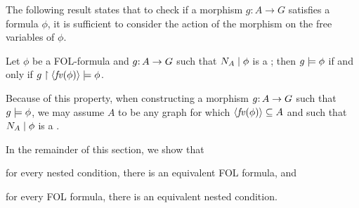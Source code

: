 \begin{comment}
When comparing the satisfaction relations for nested conditions and FOL formulas, a technical issue is that the sets of models for which they are defined are not the same: as seen above, $g\sat\phi$ is defined for $g\of A\to G$ whenever $\fv(\phi)\subseteq N_A$, whereas $g\sat\cT$ for a nested condition $\cT$ is only defined if $A$ is \emph{precisely} $I_\cT$. Due to this discrepancy, there cannot be any $\phi$ and $\cT$ such that $g\sat \phi$ if and only if $g\sat \cT$; instead, the best we can hope for is that this holds whenever $A=\tupof{\fv(\phi)}$. The following property implies that this is indeed all we need to be interested in, since $g$-images for $A$-elements outside $\fv(\phi)$ do not make a difference for satisfaction.

\begin{proposition}\label{prop:free vars only-old}
Let $\phi$ be a FOL-formula and $g\of A\to G$ such that $\fv(\phi)\subseteq N_A$; then $g\sat \phi$ if and only if $g\restr \tupof{\fv(\phi)}\sat \phi$.
\end{proposition}
%
Because of this property, when constructing a morphism $g\of A\to G$ such that $g\sat \phi$, we may assume $A$ to be any graph for which $\tupof{\fv(\phi)}\subseteq A$, without loss of generality.
\end{comment}

The following result states that to check if a morphism $g:A \to G$ satisfies a formula $\phi$, it is sufficient to consider the action of the morphism on the free variables of $\phi$.

\begin{proposition}\label{prop:free vars only}
	Let $\phi$ be a FOL-formula and $g{:}\, A\rightarrow G$ such that ${N_A} \mid {\phi}$ is a {\cfor}; then $g\models \phi$ if and only if $g\restriction \langle \mathit{fv}(\phi)\rangle\models \phi$.
\end{proposition}
%
Because of this property, when constructing a morphism $g{:}\, A\rightarrow G$ such that $g\models \phi$, we may assume $A$ to be any graph for which $\langle \mathit{fv}(\phi)\rangle\subseteq A$ and such that ${N_A} \mid {\phi}$ is a {\cfor}.

\medskip

In the remainder of this section, we show that
%
\begin{inumerate}
\item for every nested condition, there is an 
equivalent FOL formula, and
\item for every FOL formula, there is an 
equivalent nested condition.
\end{inumerate}
%

